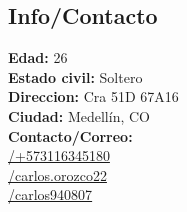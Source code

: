 \documentclass[]{cv-class}
\begin{document}
\begin{aside}
	\section{Info/Contacto}
	\textbf{Edad:} 26 \\
	\textbf{Estado civil:} Soltero \\
	\textbf{Direccion:} Cra 51D 67A16 \\
	\textbf{Ciudad:} Medellín, CO \\ 
	\textbf{Contacto/Correo:}\\ \href{https://bit.ly/3ls6eXV}{/+573116345180}\\
	\href{https://join.skype.com/invite/GVNxPbWtJxdc}{/carlos.orozco22}\\
	\href{mailto:carlos940807@gmail.com}{/carlos940807}
	~

\end{aside}
\end{document}

